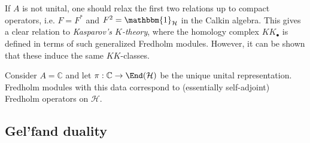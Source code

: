     \begin{remark}
        If $A$ is not unital, one should relax the first two relations up to compact operators, i.e. $F=F^*$ and $F^2=\mathbbm{1}_\mathcal{H}$ in the Calkin algebra. This gives a clear relation to \textit{Kasparov's $K$-theory}, where the homology complex $KK_\bullet$ is defined in terms of such generalized Fredholm modules. However, it can be shown that these induce the same $KK$-classes.
    \end{remark}

    \begin{example}
        Consider $A=\mathbb{C}$ and let $\pi:\mathbb{C}\rightarrow\End(\mathcal{H})$ be the unique unital representation. Fredholm modules with this data correspond to (essentially self-adjoint) Fredholm operators on $\mathcal{H}$.
    \end{example}

\subsection{Gel'fand duality}

